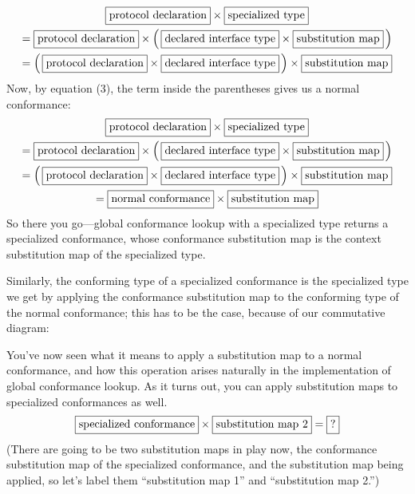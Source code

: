 \documentclass[a4paper,headsepline,bibliography=totoc,toc=flat,fleqn,twoside=semi]{scrbook}
\theoremstyle{definition}
\theoremstyle{definition}
\theoremstyle{definition}
\newcommand{\mathboxed}[1]{\boxed{\mbox{\vphantom{pI\texttt{pI}}#1}}}
\begin{document}
\begin{gather*}
\mathboxed{protocol declaration} \times \mathboxed{specialized type}\\
= \mathboxed{protocol declaration} \times \left(\,\mathboxed{declared interface type} \times \mathboxed{substitution map}\,\right)\\
= \left(\,\mathboxed{protocol declaration} \times \mathboxed{declared interface type}\,\right) \times \mathboxed{substitution map}
\end{gather*}
Now, by equation (3), the term inside the parentheses gives us a normal conformance:
\begin{multline*}
\mathboxed{protocol declaration} \times \mathboxed{specialized type}\\
= \mathboxed{protocol declaration} \times \left(\,\mathboxed{declared interface type} \times \mathboxed{substitution map}\,\right)\\
= \left(\,\mathboxed{protocol declaration} \times \mathboxed{declared interface type}\,\right) \times \mathboxed{substitution map}\\
= \mathboxed{normal conformance} \times \mathboxed{substitution map}
\end{multline*}
So there you go---global conformance lookup with a specialized type returns a specialized conformance, whose conformance substitution map is the context substitution map of the specialized type.

Similarly, the conforming type of a specialized conformance is the specialized type we get by applying the conformance substitution map to the conforming type of the normal conformance; this has to be the case, because of our commutative diagram:
\begin{quote}
\end{quote}

You've now seen what it means to apply a substitution map to a normal conformance, and how this operation arises naturally in the implementation of global conformance lookup. As it turns out, you can apply substitution maps to specialized conformances as well.
\begin{multline*}
\mathboxed{specialized conformance}\times\mathboxed{substitution map 2}=\mathboxed{?}\\
\end{multline*}
(There are going to be two substitution maps in play now, the conformance substitution map of the specialized conformance, and the substitution map being applied, so let's label them ``substitution map 1'' and ``substitution map 2.'')
\end{document}
